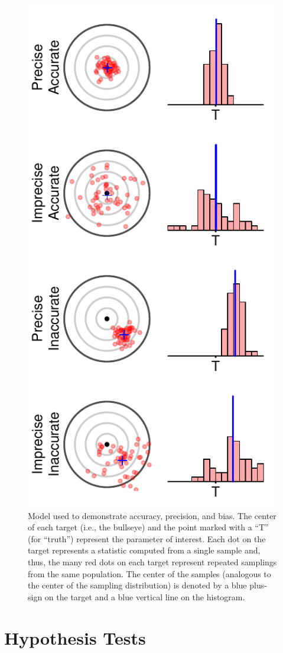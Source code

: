\documentclass[10pt,openany]{book}\usepackage[]{graphicx}\usepackage[]{color}
\newenvironment{knitrout}{}{} %
\begin{document}
\begin{knitrout}
\color{fgcolor}\begin{figure}[hbtp]

{\centering \includegraphics[width=.4\linewidth]{Figs/AccPrec-1} 

}

\caption[Accuracy and precision model]{Model used to demonstrate accuracy, precision, and bias. The center of each target (i.e., the bullseye) and the point marked with a ``T'' (for ``truth'') represent the parameter of interest. Each dot on the target represents a statistic computed from a single sample and, thus, the many red dots on each target represent repeated samplings from the same population. The center of the samples (analogous to the center of the sampling distribution) is denoted by a blue plus-sign on the target and a blue vertical line on the histogram.}\label{fig:AccPrec}
\end{figure}


\end{knitrout}



\chapter{Hypothesis Tests} \label{chap:HypothesisTests}

\vspace*{-24pt}
\minitoc
\vspace*{24pt}
\end{document}
